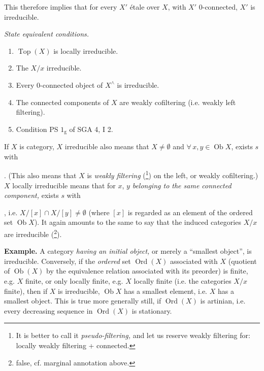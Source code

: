 \documentclass[11pt]{article}
\newcommand{\msp}[1]{\marginpar{\footnotesize [#1]}}
\begin{document}
This therefore implies that for every $X'$ étale over $X$, with $X'$ 0-connected, $X'$ is irreducible.

\textit{State equivalent conditions.}
\begin{enumerate}
\item[a)] $\operatorname{Top}(X)$ is locally irreducible.
\item[b)] The $X/x$ irreducible.
\item[c)] Every 0-connected object of $X^\wedge$ is irreducible.
\item[d)] The connected components of $X$ are weakly cofiltering (i.e. weakly left filtering).
\item[e)] Condition PS $1_{\mathrm{g}}$ of SGA 4, I 2.
\end{enumerate}
If $X$ is category, $X$ irreducible also means that $X \neq \emptyset$ and $\forall\, x, y \in \operatorname{Ob} X$, exists $s$ with . (This also means that $X$ is \textit{weakly filtering} (\footnote[11]{It is better to call it \textit{pseudo-filtering,} and let us reserve weakly filtering for: locally weakly filtering + connected.}) on the left, or weakly cofiltering.) $X$ locally irreducible means that for $x$, $y$ \textit{belonging to the same connected component,} exists $s$ with , %
\msp{page 13}
i.e. $X/[x] \cap X/[y] \neq \emptyset$ (where $[x]$ is regarded as an element of the ordered set $\operatorname{Ob} X$). It again amounts to the same to say that the induced categories $X/x$ are irreducible (\footnote[12]{false, cf. marginal annotation above.}).

\textbf{Example.} A category \textit{having an initial object,} or merely a ``smallest object'', is irreducible. Conversely, if the \textit{ordered} set $\operatorname{Ord}(X)$ associated with $X$ (quotient of $\operatorname{Ob}(X)$ by the equivalence relation associated with its preorder) is finite, e.g. $X$ finite, or only locally finite, e.g. $X$ locally finite (i.e. the categories $X/x$ finite), then if $X$ is irreducible, $\operatorname{Ob} X$ has a smallest element, i.e. $X$ has a smallest object. This is true more generally still, if $\operatorname{Ord}(X)$ is artinian, i.e. every decreasing sequence in $\operatorname{Ord}(X)$ is stationary. %
\end{document}

